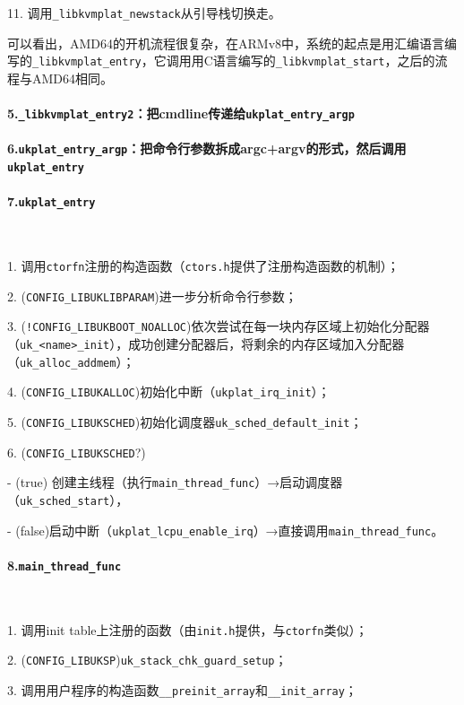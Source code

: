 \documentclass[UTF8,fontset=none,linespread=1.15]{ctexart}
\begin{document}
11. 调用\texttt{\_libkvmplat\_newstack}从引导栈切换走。

可以看出，AMD64的开机流程很复杂，在ARMv8中，系统的起点是用汇编语言编写的\texttt{\_libkvmplat\_entry}，它调用用C语言编写的\texttt{\_libkvmplat\_start}，之后的流程与AMD64相同。
\paragraph{5.\texttt{\_libkvmplat\_entry2}：把cmdline传递给\texttt{ukplat\_entry\_argp}}
\paragraph{6.\texttt{ukplat\_entry\_argp}：把命令行参数拆成argc+argv的形式，然后调用\texttt{ukplat\_entry}}
\paragraph{7.\texttt{ukplat\_entry}}
~\par
1. 调用\texttt{ctorfn}注册的构造函数（\texttt{ctors.h}提供了注册构造函数的机制）；

2. (\texttt{CONFIG\_LIBUKLIBPARAM})进一步分析命令行参数；

3. (\texttt{!CONFIG\_LIBUKBOOT\_NOALLOC})依次尝试在每一块内存区域上初始化分配器（\texttt{uk\_<name>\_init}），成功创建分配器后，将剩余的内存区域加入分配器（\texttt{uk\_alloc\_addmem}）；

4. (\texttt{CONFIG\_LIBUKALLOC})初始化中断（\texttt{ukplat\_irq\_init}）；

5. (\texttt{CONFIG\_LIBUKSCHED})初始化调度器\texttt{uk\_sched\_default\_init}；

6. (\texttt{CONFIG\_LIBUKSCHED}?)

- (true) 创建主线程（执行\texttt{main\_thread\_func}）→启动调度器（\texttt{uk\_sched\_start}），

- (false)启动中断（\texttt{ukplat\_lcpu\_enable\_irq}）→直接调用\texttt{main\_thread\_func}。

\paragraph{8.\texttt{main\_thread\_func}}
~\par
1. 调用init table上注册的函数（由\texttt{init.h}提供，与\texttt{ctorfn}类似）；

2. (\texttt{CONFIG\_LIBUKSP})\texttt{uk\_stack\_chk\_guard\_setup}；

3. 调用用户程序的构造函数\texttt{\_\_preinit\_array}和\texttt{\_\_init\_array}；
\end{document}
